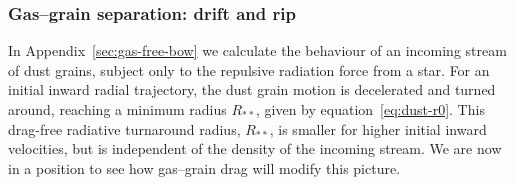 \message{ !name(dusty-bow-wave.tex)}\documentclass[useAMS, usenatbib, a4paper]{mnras}
\newcommand\drag{\ensuremath{_{\text{drag}}}}
\newcommand\starstar{\ensuremath{_{**}}}
\begin{document}



\subsubsection{Gas--grain separation: drift and rip}
\label{sec:gas-grain-separ}

In Appendix~\ref{sec:gas-free-bow} we calculate the behaviour of an
incoming stream of dust grains, subject only to the repulsive
radiation force from a star.  For an initial inward radial trajectory,
the dust grain motion is decelerated and turned around, reaching a
minimum radius \(R\starstar\), given by equation~\eqref{eq:dust-r0}.
This drag-free radiative turnaround radius, \(R\starstar\), is smaller
for higher initial inward velocities, but is independent of the
density of the incoming stream.  We are now in a position to see how
gas--grain drag will modify this picture.
\end{document}
